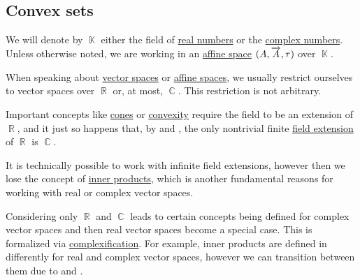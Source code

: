 \subsection{Convex sets}\label{subsec:convex_sets}

We will denote by \( \BbbK \) either the field of \hyperref[def:real_numbers]{real numbers} or the \hyperref[def:real_numbers]{complex numbers}. Unless otherwise noted, we are working in an \hyperref[def:affine_space]{affine space} \( (A, \overrightarrow{A}, \tau) \) over \( \BbbK \).

\begin{remark}\label{rem:real_field_extensions}
  When speaking about \hyperref[def:vector_space]{vector spaces} or \hyperref[def:affine_space]{affine spaces}, we usually restrict ourselves to vector spaces over \( \BbbR \) or, at most, \( \BbbC \). This restriction is not arbitrary.

  Important concepts like \hyperref[def:geometric_cone]{cones} or \hyperref[def:convex_hull]{convexity} require the field to be an extension of \( \BbbR \), and it just so happens that, by  and , the only nontrivial finite \hyperref[def:field/submodel]{field extension} of \( \BbbR \) is \( \BbbC \).

  It is technically possible to work with infinite field extensions, however then we lose the concept of \hyperref[def:inner_product_space]{inner products}, which is another fundamental reasons for working with real or complex vector spaces.

  Considering only \( \BbbR \) and \( \BbbC \) leads to certain concepts being defined for complex vector spaces and then real vector spaces become a special case. This is formalized via \hyperref[def:complexification]{complexification}. For example, inner products are defined in  differently for real and complex vector spaces, however we can transition between them due to  and .
\end{remark}

